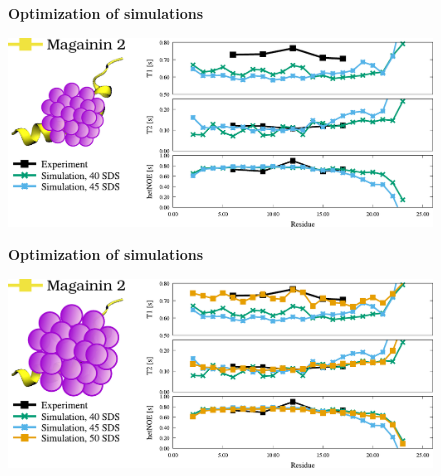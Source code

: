 \documentclass{beamer}
\begin{document}
\addtocounter{framenumber}{-1}
\begin{frame}
\begin{center}
\Large{\centering

\textbf{Optimization of simulations} \\}

\vspace{0.5cm}


\includegraphics[height=5cm]{mag2.pdf}
\end{center}
\end{frame}


\addtocounter{framenumber}{-1}
\begin{frame}
\begin{center}
\Large{\centering

\textbf{Optimization of simulations} \\}

\vspace{0.5cm}


\includegraphics[height=5cm]{mag1.pdf}
\end{center}
\end{frame}
\end{document}
